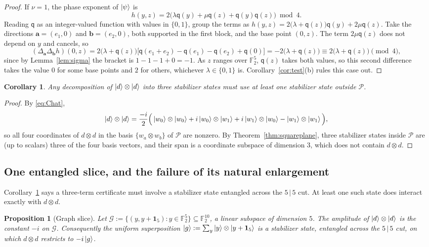 \documentclass[11pt]{article}
\theoremstyle{plain}
\newtheorem{proposition}[theorem]{Proposition}
\newtheorem{corollary}[theorem]{Corollary}
\theoremstyle{definition}
\newcommand{\F}{\mathbb{F}}
\newcommand{\qq}{\mathsf{q}}
\newcommand{\one}{\mathbf{1}}
\begin{document}
\begin{proof}
If $\nu=1$, the phase exponent of $\ket\psi$ is
\[
h(y,z)=2\big(\lambda\qq(y)+\mu\qq(z)+\qq(y)\qq(z)\big)\bmod4 .
\]
Reading $\qq$ as an integer-valued function with values in $\{0,1\}$, group the terms as
$h(y,z)=2\big(\lambda+\qq(z)\big)\qq(y)+2\mu\qq(z)$. Take the directions
$\mathbf a=(e_1,0)$ and $\mathbf b=(e_2,0)$, both supported in the first block, and the
base point $(0,z)$. The term $2\mu\qq(z)$ does not depend on $y$ and cancels, so
\[
(\Delta_{\mathbf a}\Delta_{\mathbf b}h)(0,z)
=2\big(\lambda+\qq(z)\big)\big[\qq(e_1+e_2)-\qq(e_1)-\qq(e_2)+\qq(0)\big]
=-2\big(\lambda+\qq(z)\big)\equiv 2\big(\lambda+\qq(z)\big)\pmod 4,
\]
since by Lemma~\ref{lem:sigma} the bracket is $1-1-1+0=-1$. As $z$ ranges over
$\F_2^5$, $\qq(z)$ takes both values, so this second difference takes the value $0$ for
some base points and $2$ for others, whichever $\lambda\in\{0,1\}$ is.
Corollary~\ref{cor:test}(b) rules this case out.
\end{proof}

\begin{corollary}\label{cor:noplane}
Any decomposition of $\ket d\otimes\ket d$ into three stabilizer states must use at
least one stabilizer state outside $\mathcal P$.
\end{corollary}

\begin{proof}
By \eqref{eq:Chat},
\[
\ket d\otimes\ket d=\frac{-i}2\Big(\ket{w_0}\otimes\ket{w_0}+i\ket{w_0}\otimes\ket{w_1}
+i\ket{w_1}\otimes\ket{w_0}-\ket{w_1}\otimes\ket{w_1}\Big),
\]
so all four coordinates of $d\otimes d$ in the basis $\{w_a\otimes w_b\}$ of
$\mathcal P$ are nonzero. By Theorem~\ref{thm:squareplane}, three stabilizer states
inside $\mathcal P$ are (up to scalars) three of the four basis vectors, and their span
is a coordinate subspace of dimension $3$, which does not contain $d\otimes d$.
\end{proof}

\subsection{One entangled slice, and the failure of its natural enlargement}

Corollary~\ref{cor:noplane} says a three-term certificate must involve a stabilizer
state entangled across the $5\,|\,5$ cut. At least one such state does interact
exactly with $d\otimes d$.

\begin{proposition}[Graph slice]\label{prop:graph}
Let $\mathcal G:=\{(y,y+\one_5):y\in\F_2^5\}\subseteq\F_2^{10}$, a linear
subspace of dimension $5$. The amplitude of $\ket d\otimes\ket d$ is the constant $-i$
on $\mathcal G$. Consequently the uniform superposition
$\ket{g}:=\sum_{y}\ket{y}\otimes\ket{y+\one_5}$ is a stabilizer state, entangled across the
$5\,|\,5$ cut, on which $d\otimes d$ restricts to $-i\ket g$.
\end{proposition}
\end{document}
